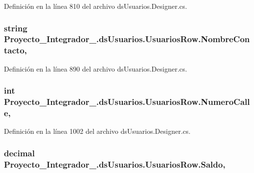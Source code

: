 Definición en la línea 810 del archivo ds\-Usuarios.\-Designer.\-cs.

\hypertarget{class_proyecto___integrador__3_1_1ds_usuarios_1_1_usuarios_row_aec944b13be287218767cf4fe5abefbe5}{
\subsubsection[{Nombre\-Contacto}]{\setlength{\rightskip}{0pt plus 5cm}string Proyecto\-\_\-\-Integrador\-\_.\-ds\-Usuarios.\-Usuarios\-Row.\-Nombre\-Contacto\hspace{0.3cm}{\ttfamily [get]}, {\ttfamily [set]}}}\label{class_proyecto___integrador__3_1_1ds_usuarios_1_1_usuarios_row_aec944b13be287218767cf4fe5abefbe5}


Definición en la línea 890 del archivo ds\-Usuarios.\-Designer.\-cs.

\hypertarget{class_proyecto___integrador__3_1_1ds_usuarios_1_1_usuarios_row_aa0af07f9536d8af14cabf3e7c7db4055}{
\subsubsection[{Numero\-Calle}]{\setlength{\rightskip}{0pt plus 5cm}int Proyecto\-\_\-\-Integrador\-\_.\-ds\-Usuarios.\-Usuarios\-Row.\-Numero\-Calle\hspace{0.3cm}{\ttfamily [get]}, {\ttfamily [set]}}}\label{class_proyecto___integrador__3_1_1ds_usuarios_1_1_usuarios_row_aa0af07f9536d8af14cabf3e7c7db4055}


Definición en la línea 1002 del archivo ds\-Usuarios.\-Designer.\-cs.

\hypertarget{class_proyecto___integrador__3_1_1ds_usuarios_1_1_usuarios_row_a8767d20d2bfa9f4e265f9bb2fb38fffd}{
\subsubsection[{Saldo}]{\setlength{\rightskip}{0pt plus 5cm}decimal Proyecto\-\_\-\-Integrador\-\_.\-ds\-Usuarios.\-Usuarios\-Row.\-Saldo\hspace{0.3cm}{\ttfamily [get]}, {\ttfamily [set]}}}\label{class_proyecto___integrador__3_1_1ds_usuarios_1_1_usuarios_row_a8767d20d2bfa9f4e265f9bb2fb38fffd}


